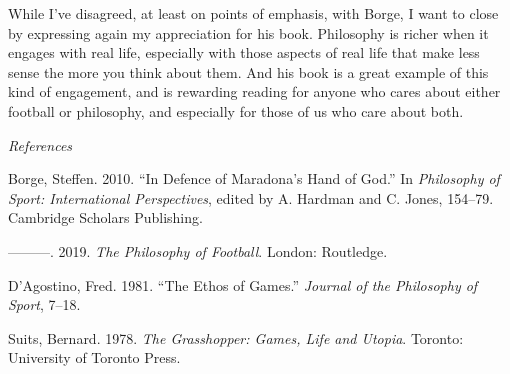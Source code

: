 \documentclass[
  12pt,
]{article}
\newlength{\cslhangindent}
\newlength{\cslentryspacingunit} %
\newenvironment{CSLReferences}[2] %
 {%
  \setlength{\parindent}{0pt}
  \ifodd #1
  \let\oldpar\par
  \def\par{\hangindent=\cslhangindent\oldpar}
  \fi
  \setlength{\parskip}{#2\cslentryspacingunit}
 }%
 {}
\begin{document}
While I've disagreed, at least on points of emphasis, with Borge, I want to close by expressing again my appreciation for his book. Philosophy is richer when it engages with real life, especially with those aspects of real life that make less sense the more you think about them. And his book is a great example of this kind of engagement, and is rewarding reading for anyone who cares about either football or philosophy, and especially for those of us who care about both.

\emph{References}

\hypertarget{refs}{}
\begin{CSLReferences}{1}{0}
\leavevmode{}%
Borge, Steffen. 2010. {``In Defence of Maradona's Hand of God.''} In \emph{Philosophy of Sport: International Perspectives}, edited by A. Hardman and C. Jones, 154--79. Cambridge Scholars Publishing.

\leavevmode{}%
---------. 2019. \emph{The Philosophy of Football}. London: Routledge.

\leavevmode{}%
D'Agostino, Fred. 1981. {``The Ethos of Games.''} \emph{Journal of the Philosophy of Sport}, 7--18.

\leavevmode{}%
Suits, Bernard. 1978. \emph{The Grasshopper: Games, Life and Utopia}. Toronto: University of Toronto Press.

\end{CSLReferences}
\end{document}
